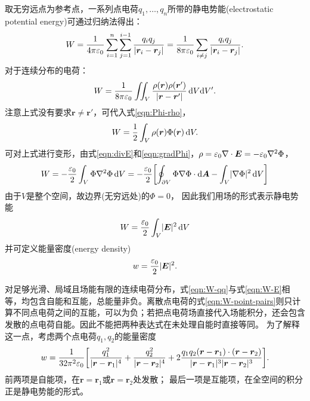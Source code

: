 取无穷远点为参考点，一系列点电荷$q_1,\ldots,q_n$所带的静电势能(electrostatic potential energy)可通过归纳法得出：
\begin{equation}
    \label{eqn:W-point-pairs}
    W = \frac1{4\pi\varepsilon_0}\sum_{i=1}^n\sum_{j=1}^{i-1}\frac{q_iq_j}{\lvert\bm r_i - \bm r_j\rvert} = \frac1{8\pi\varepsilon_0}\sum_{i\neq j}\frac{q_iq_j}{\lvert\bm r_i - \bm r_j\rvert}.
\end{equation}
对于连续分布的电荷：
\begin{equation}
    \label{eqn:W-qq}
    W = \frac1{8\pi\varepsilon_0}\iint_V\frac{\rho(\bm r)\rho(\bm r')}{\lvert\bm r - \bm r'\rvert}\mathop{}\!\mathrm{d} V\mathrm{d} V'.
\end{equation}
注意上式没有要求$\bm r \neq \bm r'$，可代入式\eqref{eqn:Phi-rho}，
\begin{equation}
    \label{eqn:W-rhoPhi}
    W = \frac12\int_V\rho(\bm r)\Phi(\bm r)\mathop{}\!\mathrm{d} V.
\end{equation}
可对上式进行变形，由式\eqref{eqn:divE}和\eqref{eqn:gradPhi}，$\rho = \varepsilon_0\nabla\cdot\bm E = -\varepsilon_0\nabla^2\Phi$，
\begin{equation*}
    W = -\frac{\varepsilon_0}2\int_V\Phi\nabla^2\Phi\mathop{}\!\mathrm{d} V = -\frac{\varepsilon_0}2\biggl[\oint_{\partial V}\Phi\nabla\Phi \cdot \mathop{}\!\mathrm{d}\bm A - \int_V\lvert\nabla\Phi\rvert^2\mathop{}\!\mathrm{d} V\biggr]
\end{equation*}
由于$V$是整个空间，故边界(无穷远处)的$\Phi = 0$，
因此我们用场的形式表示静电势能
\begin{equation}
    \label{eqn:W-E}
    W = \frac{\varepsilon_0}2\int_V\lvert\bm E\rvert^2\mathop{}\!\mathrm{d} V
\end{equation}
并可定义能量密度(energy density)
\begin{equation}
    w = \frac{\varepsilon_0}2\lvert\bm E\rvert^2.
\end{equation}

对足够光滑、局域且场能有限的连续电荷分布，式\eqref{eqn:W-qq}与式\eqref{eqn:W-E}相等，均包含自能和互能，总能量非负。离散点电荷的式\eqref{eqn:W-point-pairs}则只计算不同点电荷之间的互能，可以为负；若把点电荷场直接代入场能积分，还会包含发散的点电荷自能。因此不能把两种表达式在未处理自能时直接等同。
为了解释这一点，考虑两个点电荷$q_1,q_2$的能量密度
\[
    w = \frac1{32\pi^2\varepsilon_0}\biggl[\frac{q_1^2}{\lvert\bm r - \bm r_1\rvert^4} + \frac{q_2^2}{\lvert\bm r - \bm r_2\rvert^4} + 2\frac{q_1q_2(\bm r - \bm r_1) \cdot (\bm r - \bm r_2)}{\lvert\bm r - \bm r_1\rvert^3\lvert\bm r - \bm r_2\rvert^3}\biggr].
\]
前两项是自能项，在$\bm r = \bm r_1$或$\bm r = \bm r_2$处发散；
最后一项是互能项，在全空间的积分正是静电势能的形式。

